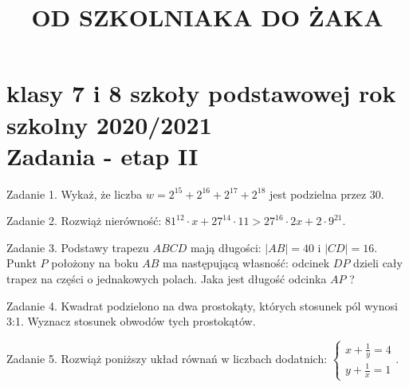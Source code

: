 \documentclass[10pt]{article}
\title{OD SZKOLNIAKA DO ŻAKA }
\author{}
\date{}
\begin{document}
\maketitle
\section*{klasy 7 i 8 szkoły podstawowej rok szkolny 2020/2021 \\
 Zadania - etap II}
Zadanie 1. Wykaż, że liczba \(w=2^{15}+2^{16}+2^{17}+2^{18}\) jest podzielna przez 30.

Zadanie 2. Rozwiąż nierówność: \(81^{12} \cdot x+27^{14} \cdot 11>27^{16} \cdot 2 x+2 \cdot 9^{21}\).

Zadanie 3. Podstawy trapezu \(A B C D\) mają długości: \(|A B|=40\) i \(|C D|=16\). Punkt \(P\) położony na boku \(A B\) ma następującą własność: odcinek \(D P\) dzieli cały trapez na części o jednakowych polach. Jaka jest długość odcinka \(A P\) ?

Zadanie 4. Kwadrat podzielono na dwa prostokąty, których stosunek pól wynosi 3:1. Wyznacz stosunek obwodów tych prostokątów.

Zadanie 5. Rozwiąż poniższy układ równań w liczbach dodatnich: \(\left\{\begin{array}{l}x+\frac{1}{y}=4 \\ y+\frac{1}{x}=1\end{array}\right.\).
\end{document}
